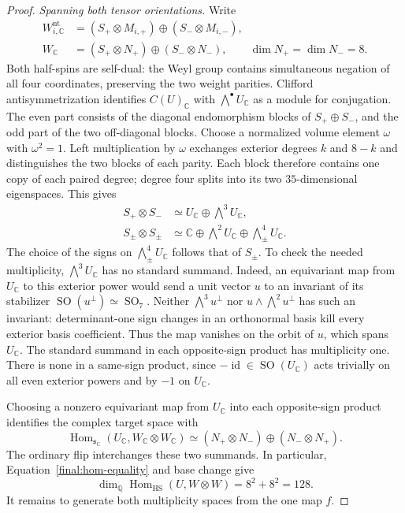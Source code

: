 \documentclass[11pt]{amsart}
\newcommand{\Q}{\mathbb Q}
\newcommand{\C}{\mathbb C}
\DeclareMathOperator{\Hom}{Hom}
\DeclareMathOperator{\SO}{SO}
\DeclareMathOperator{\id}{id}
\theoremstyle{definition}
\theoremstyle{remark}
\numberwithin{equation}{section}
\begin{document}
\begin{proof}
\emph{Spanning both tensor orientations.}
Write
\[
 \begin{aligned}
 W_{i,\C}^{\mathrm{nt}}
   &=(S_+\otimes M_{i,+})\oplus(S_-\otimes M_{i,-}),\\
 W_{\C}&=(S_+\otimes N_+)\oplus(S_-\otimes N_-),
       \qquad \dim N_+=\dim N_-=8.
 \end{aligned}
\]
Both half-spins are self-dual: the Weyl group contains simultaneous
negation of all four coordinates, preserving the two weight
parities.  Clifford antisymmetrization identifies
$C(U)_\C$ with $\bigwedge^\bullet U_\C$ as a module for conjugation.
The even part consists of the diagonal endomorphism blocks of
$S_+\oplus S_-$, and the odd part of the two off-diagonal blocks.
Choose a normalized volume element $\omega$ with $\omega^2=1$.
Left multiplication by $\omega$ exchanges exterior degrees $k$ and
$8-k$ and distinguishes the two blocks of each parity.  Each block
therefore contains one copy of each paired degree; degree four
splits into its two $35$-dimensional eigenspaces.  This gives
\begin{equation}\label{final:spin-products}
 \begin{aligned}
 S_+\otimes S_-&\simeq U_{\C}\oplus\bigwedge^3U_{\C},\\
 S_\pm\otimes S_\pm&\simeq
 \C\oplus\bigwedge^2U_{\C}\oplus\bigwedge^4_\pm U_{\C}.
 \end{aligned}
\end{equation}
The choice of the signs on $\bigwedge^4_\pm U_\C$ follows that of
$S_\pm$.  To check the needed multiplicity, $\bigwedge^3U_\C$ has
no standard summand.  Indeed, an equivariant map from $U_\C$ to
this exterior power would send a unit vector $u$ to an invariant
of its stabilizer $\SO(u^\perp)\simeq\SO_7$.  Neither
$\bigwedge^3u^\perp$ nor $u\wedge\bigwedge^2u^\perp$ has such an
invariant: determinant-one sign changes in an orthonormal basis
kill every exterior basis coefficient.  Thus the map vanishes on
the orbit of $u$, which spans $U_\C$.  The standard summand in each
opposite-sign product has multiplicity one.  There is none in a
same-sign product, since $-\id\in\SO(U_\C)$ acts trivially on all
even exterior powers and by $-1$ on $U_\C$.

Choosing a nonzero equivariant map from $U_\C$ into each opposite-sign
product identifies the complex target space with
\[
 \Hom_{\mathfrak s_\C}(U_\C,W_\C\otimes W_\C)
 \simeq (N_+\otimes N_-)\oplus(N_-\otimes N_+).
\]
The ordinary flip interchanges these two summands.  In particular,
Equation~\eqref{final:hom-equality} and base change give
\[
 \dim_\Q\Hom_{\mathrm{HS}}(U,W\otimes W)=8^2+8^2=128.
\]
It remains to generate both multiplicity spaces from the one map $f$.


\end{proof}
\end{document}
